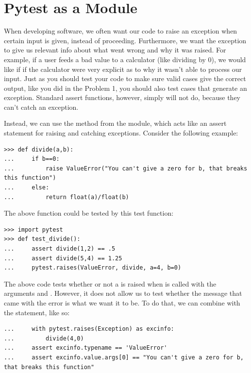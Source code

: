\section*{Pytest as a Module} %

When developing software, we often want our code to raise an exception when certain input is given, instead of proceeding.  Furthermore, we want the exception to give us relevant info about what went wrong and why it was raised.
For example, if a user feeds a bad value to a calculator (like dividing by 0), we would like if if the calculator were very explicit as to why it wasn't able to process our input.
Just as you should test your code to make sure valid cases give the correct output, like you did in the Problem 1, you should also test cases that generate an exception.  Standard assert functions, however, simply will not do, because they can't catch an exception.

Instead, we can use the  method from the  module, which acts like an assert statement for raising and catching exceptions.
Consider the following example:

\begin{lstlisting}
>>> def divide(a,b):
...     if b==0:
...         raise ValueError("You can't give a zero for b, that breaks this function")
...     else:
...         return float(a)/float(b)
\end{lstlisting}

The above function could be tested by this test function:

\begin{lstlisting}
>>> import pytest
>>> def test_divide():
...     assert divide(1,2) == .5
...     assert divide(5,4) == 1.25
...     pytest.raises(ValueError, divide, a=4, b=0)

\end{lstlisting}

The above code tests whether or not a  is raised when  is called with the arguments  and .  However, it does not allow us to test whether the message that came with the error is what we want it to be.  To do that, we can combine  with the  statement, like so:

\begin{lstlisting}
...     with pytest.raises(Exception) as excinfo:
...         divide(4,0)
...     assert excinfo.typename == 'ValueError'
...     assert excinfo.value.args[0] == "You can't give a zero for b, that breaks this function"
\end{lstlisting}

